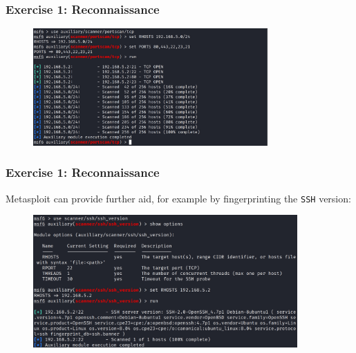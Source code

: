 \documentclass[handout]{beamer}
\begin{document}
\begin{frame}
    \frametitle{Exercise 1: Reconnaissance}
    
    
	\begin{figure}
    	\centering
    	\includegraphics[width=0.8\textwidth]{../drawable/exercise_1_screenshots/es1-scan.jpg}
	\end{figure}
	
    
	
\end{frame}

\begin{frame}
    \frametitle{Exercise 1: Reconnaissance}
    Metasploit can provide further aid, for example by fingerprinting the \texttt{SSH} version:
    
	\begin{figure}
    	\centering
    	\includegraphics[width=0.9\textwidth]{../drawable/exercise_1_screenshots/es1-ssh.jpg}
	\end{figure}
\end{frame}
\end{document}
